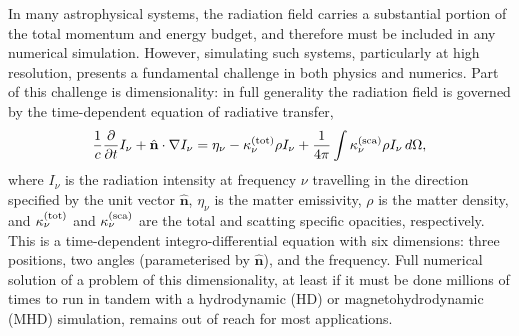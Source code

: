 \documentclass[fleqn,usenatbib]{mnras}
\newcommand{\hatn}{\hat{\mathbf{n}}}
\begin{document}
In many astrophysical systems, the radiation field carries a substantial portion of the total momentum and energy budget, and therefore must be included in any numerical simulation. However, simulating such systems, particularly at high resolution, presents a fundamental challenge in both physics and numerics. Part of this challenge is dimensionality: in full generality the radiation field is governed by the time-dependent equation of radiative transfer,
\begin{equation}
\frac{1}{c} \frac{\partial}{\partial t} I_\nu + \hatn\cdot\nabla I_\nu = \eta_\nu - \kappa^{\rm (tot)}_\nu \rho I_\nu + \frac{1}{4\pi} \int \kappa^{\rm (sca)}_\nu \rho I_\nu \, d\Omega,
\label{eq:transfer}
\end{equation}
where $I_\nu$ is the radiation intensity at frequency $\nu$ travelling in the direction specified by the unit vector $\hatn$, $\eta_\nu$ is the matter emissivity, $\rho$ is the matter density, and $\kappa_\nu^{\rm (tot)}$ and $\kappa_\nu^{\rm (sca)}$ are the total and scatting specific opacities, respectively. This is a time-dependent integro-differential equation with six dimensions: three positions, two angles (parameterised by $\hatn$), and the frequency. Full numerical solution of a problem of this dimensionality, at least if it must be done millions of times to run in tandem with a hydrodynamic (HD) or magnetohydrodynamic (MHD) simulation, remains out of reach for most applications. 
\end{document}
